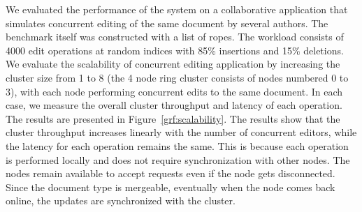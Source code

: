 \documentclass[twocolumn,9pt]{extarticle}
\begin{document}
We evaluated the performance of the system on a collaborative application that
simulates concurrent editing of the same document by several authors. The
benchmark itself was constructed with a list of ropes. The workload consists of
4000 edit operations at random indices with 85\% insertions and 15\% deletions.
We evaluate the scalability of concurrent editing application by increasing the
cluster size from 1 to 8 (the 4 node ring cluster consists of nodes numbered 0
to 3), with each node performing concurrent edits to the same document. In each
case, we measure the overall cluster throughput and latency of each operation.
The results are presented in Figure~\ref{grf:scalability}. The results show
that the cluster throughput increases linearly with the number of concurrent
editors, while the latency for each operation remains the same. This is because
each operation is performed locally and does not require synchronization with
other nodes. The nodes remain available to accept requests even if the node
gets disconnected. Since the document type is mergeable, eventually when the
node comes back online, the updates are synchronized with the cluster.

\clearpage


\small

\end{document}

